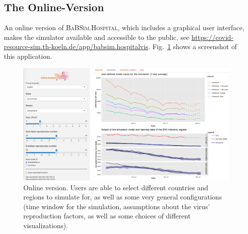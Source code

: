 \documentclass[conference]{IEEEtran}
\def\figref#1{Fig.~\ref{#1}}
\newcommand{\babsimhospital}{\textsc{BaBSim.Hospital}\xspace}
\begin{document}
\subsection{The Online-Version}\label{sec:online}
An online version of \babsimhospital, 
which includes a graphical user interface, 
makes the simulator available and accessible to the public, see \url{https://covid-resource-sim.th-koeln.de/app/babsim.hospitalvis}.
\figref{fig:demo} shows a screenshot of this application.
\begin{figure}
    \centering
    \includegraphics[width=\linewidth]{demoFR.png}
    \caption{Online version. Users are able to select different countries and regions to simulate
for, as well as some very general configurations (time window for
the simulation, assumptions about the virus' reproduction factors, as well as some choices of different visualizations).}
\label{fig:demo}
\end{figure}
\end{document}
